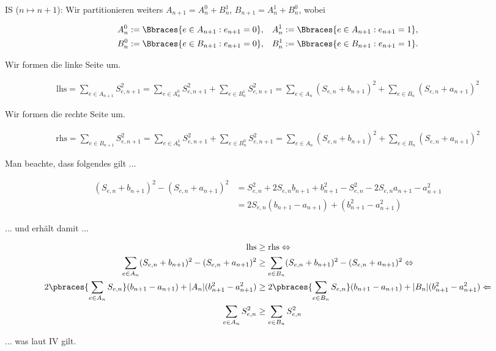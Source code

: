 \begin{solution}
IS ($n \mapsto n+1$): Wir partitionieren weiters $A_{n+1} = A_n^0 + B_n^1$, $B_{n+1} = A_n^1 + B_n^0$, wobei

\begin{align*}
  A_n^0 & := \Bbraces{e \in A_{n+1}: e_{n+1} = 0}, &
  A_n^1 & := \Bbraces{e \in A_{n+1}: e_{n+1} = 1}, \\
  B_n^0 & := \Bbraces{e \in B_{n+1}: e_{n+1} = 0}, &
  B_n^1 & := \Bbraces{e \in B_{n+1}: e_{n+1} = 1}.
\end{align*}

Wir formen die linke Seite um.

\begin{align*}
  \text{lhs}
  =
  \sum_{e \in A_{n+1}} S_{e, n+1}^2
  =
  \sum_{e \in A_n^0} S_{e, n+1}^2 +
  \sum_{e \in B_n^1} S_{e, n+1}^2
  =
  \sum_{e \in A_n} (S_{e, n} + b_{n+1})^2 +
  \sum_{e \in B_n} (S_{e, n} + a_{n+1})^2
\end{align*}

Wir formen die rechte Seite um.

\begin{align*}
  \text{rhs}
  =
  \sum_{e \in B_{n+1}} S_{e, n+1}^2
  =
  \sum_{e \in A_n^1} S_{e, n+1}^2 +
  \sum_{e \in B_n^0} S_{e, n+1}^2
  =
  \sum_{e \in A_n} (S_{e, n} + b_{n+1})^2 +
  \sum_{e \in B_n} (S_{e, n} + a_{n+1})^2
\end{align*}

Man beachte, dass folgendes gilt ...

\begin{align*}
  (S_{e, n} + b_{n+1})^2 - (S_{e, n} + a_{n+1})^2
  & =
  S_{e, n}^2 + 2 S_{e, n} b_{n+1} + b_{n+1}^2 -
  S_{e, n}^2 - 2 S_{e, n} a_{n+1} - a_{n+1}^2 \\
  & =
  2 S_{e, n} (b_{n+1} - a_{n+1}) + (b_{n+1}^2 - a_{n+1}^2)
\end{align*}

... und erhält damit ...

\begin{align*}
  \text{lhs}
  & \geq
  \text{rhs}
  \Leftrightarrow \\
  \sum_{e \in A_n} (S_{e, n} + b_{n+1})^2 - (S_{e, n} + a_{n+1})^2
  & \geq
  \sum_{e \in B_n} (S_{e, n} + b_{n+1})^2 - (S_{e, n} + a_{n+1})^2
  \Leftrightarrow \\
  2 \pbraces{\sum_{e \in A_n} S_{e, n}}(b_{n+1} - a_{n+1}) + |A_n| (b_{n+1}^2 - a_{n+1}^2)
  & \geq
  2 \pbraces{\sum_{e \in B_n} S_{e, n}}(b_{n+1} - a_{n+1}) + |B_n| (b_{n+1}^2 - a_{n+1}^2)
  \Leftarrow \\
  \sum_{e \in A_n} S_{e, n}^2
  & \geq
  \sum_{e \in B_n} S_{e, n}^2
\end{align*}

... was laut IV gilt.

\end{solution}
